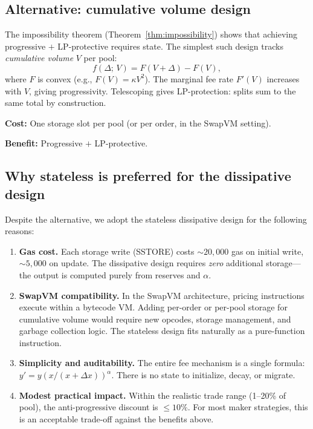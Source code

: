 \documentclass[11pt]{article}
\theoremstyle{definition}
\theoremstyle{remark}
\newcommand{\dx}{\Delta x}
\begin{document}
\subsection{Alternative: cumulative volume design}

The impossibility theorem (Theorem~\ref{thm:impossibility}) shows that achieving progressive $+$ LP-protective requires state.
The simplest such design tracks \emph{cumulative volume} $V$ per pool:
\[
f(\Delta;\,V) = F(V+\Delta) - F(V),
\]
where $F$ is convex (e.g., $F(V)=\kappa V^2$).
The marginal fee rate $F'(V)$ increases with $V$, giving progressivity.
Telescoping gives LP-protection: splits sum to the same total by construction.

\textbf{Cost:} One storage slot per pool (or per order, in the SwapVM setting).

\textbf{Benefit:} Progressive $+$ LP-protective.

\subsection{Why stateless is preferred for the dissipative design}

Despite the alternative, we adopt the stateless dissipative design for the following reasons:

\begin{enumerate}
\item \textbf{Gas cost.}
Each storage write (SSTORE) costs $\sim\!20{,}000$ gas on initial write, $\sim\!5{,}000$ on update.
The dissipative design requires \emph{zero} additional storage---the output is computed purely from reserves and $\alpha$.

\item \textbf{SwapVM compatibility.}
In the SwapVM architecture, pricing instructions execute within a bytecode VM.
Adding per-order or per-pool storage for cumulative volume would require new opcodes, storage management, and garbage collection logic.
The stateless design fits naturally as a pure-function instruction.

\item \textbf{Simplicity and auditability.}
The entire fee mechanism is a single formula: $y'=y(x/(x+\dx))^\alpha$.
There is no state to initialize, decay, or migrate.

\item \textbf{Modest practical impact.}
Within the realistic trade range (1--20\% of pool), the anti-progressive discount is $\le 10\%$.
For most maker strategies, this is an acceptable trade-off against the benefits above.
\end{enumerate}
\end{document}

